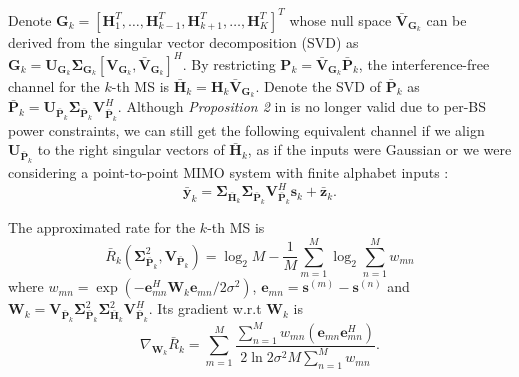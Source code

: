\documentclass{article}
\begin{document}
    Denote $\mathbf{G}_k=[\mathbf{H}_1^T,\ldots,\mathbf{H}_{k-1}^T,\mathbf{H}_{k+1}^T, \ldots , \mathbf{H}_{K}^T]^T$
    whose null space $\bar{\mathbf{V}}_{\mathbf{G}_k}$ can be derived from the singular vector decomposition (SVD) as $\mathbf{G}_k = \mathbf{U}_{\mathbf{G}_k}
    \bm{\Sigma}_{\mathbf{G}_k}[\mathbf{V}_{\mathbf{G}_k},\bar{\mathbf{V}}_{\mathbf{G}_k}]^H$. By restricting $\mathbf{P}_k = \bar{\mathbf{V}}_{\mathbf{G}_k}\bar{\mathbf{P}}_k$,
the interference-free channel for the $k$-th MS is $\bar{\mathbf{H}}_k = \mathbf{H}_k\bar{\mathbf{V}}_{\mathbf{G}_k}$.
Denote the SVD of $\bar{\mathbf{P}}_k$ as $\bar{\mathbf{P}}_k = \mathbf{U}_{\bar{\mathbf{P}}_k}\mathbf{\Sigma}_{\bar{\mathbf{P}}_k}\mathbf{V}_{\bar{\mathbf{P}}_k}^H$.
Although \emph{Proposition 2} in \cite{xiao2011globally} is no longer valid due to per-BS power constraints, we can still get the following equivalent channel if
we align $\mathbf{U}_{\bar{\mathbf{P}}_k}$ to the right singular vectors of $\bar{\mathbf{H}}_k$, as if the inputs were Gaussian or we were considering a point-to-point MIMO system with finite alphabet inputs \cite{payaro2009optimal}:
    \begin{equation}
        \label{eq:channelBDEQ}
        \bar{\mathbf{y}}_k=\mathbf{\Sigma}_{\bar{\mathbf{H}}_k}\mathbf{\Sigma}_{\bar{\mathbf{P}}_k}\mathbf{V}_{\bar{\mathbf{P}}_k}^H\mathbf{s}_k+\bar{\mathbf{z}}_k.
    \end{equation}

    The approximated rate for the $k$-th MS is \cite{zeng2012low}
    \begin{equation}
        \label{eq:ARBDAGDP}
        \bar{R}_k(\mathbf{\Sigma}_{\bar{\mathbf{P}}_k}^2,\mathbf{V}_{\bar{\mathbf{P}}_k}) = \log_2M - \frac{1}{M}\sum_{m=1}^{M}\log_2\sum_{n=1}^Mw_{mn}
    \end{equation}
    where $w_{mn} = \exp(-\mathbf{e}_{mn}^H\mathbf{W}_k\mathbf{e}_{mn}/2\sigma^2)$, $\mathbf{e}_{mn}=\mathbf{s}^{(m)}-\mathbf{s}^{(n)}$ and $\mathbf{W}_k=\mathbf{V}_{\bar{\mathbf{P}}_k}\mathbf{\Sigma}_{\bar{\mathbf{P}}_k}^2\mathbf{\Sigma}_{\bar{\mathbf{H}}_k}^2\mathbf{V}_{\bar{\mathbf{P}}_k}^H$. Its gradient w.r.t $\mathbf{W}_k$ is
    \begin{equation}
        \label{eq:gradWARBDAGDP}
        \nabla_{\mathbf{W}_k}\bar{R}_k=\sum_{m=1}^M\frac{\sum_{n=1}^Mw_{mn}(\mathbf{e}_{mn}\mathbf{e}_{mn}^H)}{2\ln2\sigma^2M\sum_{n=1}^Mw_{mn}}.
 \end{equation}
\end{document}
